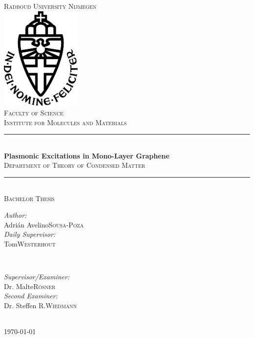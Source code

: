 \begin{titlepage}
	\thispagestyle{empty}
	\newcommand{\HRule}{\rule{\linewidth}{0.5mm}}
	\center
	\textsc{\Large Radboud University Nijmegen}\\[.7cm]
	\includegraphics[width=40mm]{img/in_dei_nomine_feliciter.eps}\\[.5cm]
	\textsc{Faculty of Science\\
	Institute for Molecules and Materials}\\[0.5cm]
	
	\HRule \\[0.4cm]
	{ \LARGE \bfseries Plasmonic Excitations in Mono-Layer Graphene}\\[0.1cm]
	\textsc{Department of Theory of Condensed Matter}\\
	\HRule \\[.5cm]
	\textsc{\large Bachelor Thesis}\\[.5cm]
	
	\begin{minipage}{0.4\textwidth}
	\begin{flushleft} \large
	\emph{Author:}\\
	Adrián Avelino\space \textsc{Sousa-Poza}\\[1em]
	\emph{Daily Supervisor:} \\
	Tom\space \textsc{Westerhout}
	\end{flushleft}
	\end{minipage}
	~
	\begin{minipage}{0.4\textwidth}
	\begin{flushright} \large
	\emph{Supervisor/Examiner:} \\
	Dr. Malte\space \textsc{Rösner} \\[1em]
	\emph{Second Examiner:} \\
	Dr. Steffen R.\space \textsc{Wiedmann} 
	\end{flushright}
	\end{minipage}\\[4cm]
	\vfill
	{\large \today}\\
	\clearpage
\end{titlepage}